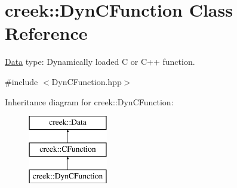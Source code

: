 \hypertarget{classcreek_1_1_dyn_c_function}{}\section{creek\+:\+:Dyn\+C\+Function Class Reference}
\label{classcreek_1_1_dyn_c_function}


\hyperlink{classcreek_1_1_data}{Data} type\+: Dynamically loaded C or C++ function.  




{\ttfamily \#include $<$Dyn\+C\+Function.\+hpp$>$}

Inheritance diagram for creek\+:\+:Dyn\+C\+Function\+:\begin{figure}[H]
\begin{center}
\leavevmode
\includegraphics[height=3.000000cm]{classcreek_1_1_dyn_c_function}
\end{center}
\end{figure}
